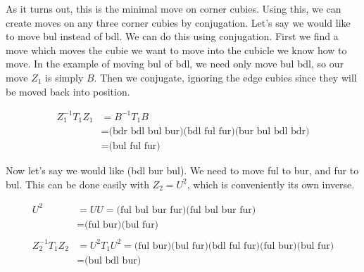 As it turns out, this is the minimal move on corner cubies.  Using
this, we can create moves on any three corner cubies by conjugation.
Let's say we would like to move bul instead of bdl.  We can do this
using conjugation.  First we find a move which moves the cubie we want
to move into the cubicle we know how to move.  In the example of
moving bul of bdl, we need only move bul bdl, so our move $Z_1$ is
simply $B$.  Then we conjugate, ignoring the edge cubies since they
will be moved back into position.

\begin{align*}
  Z_1^{-1}T_1Z_1
  &= B^{-1}T_1B \\
  &= \text{(bdr bdl bul bur)(bdl ful fur)(bur bul bdl bdr)} \\
  &= \text{(bul ful fur)}
\end{align*}

Now let's say we would like (bdl bur bul).  We need to move ful to
bur, and fur to bul.  This can be done easily with $Z_2 = U^2$, which
is conveniently its own inverse.

\begin{align*}
  U^2
  &= UU = \text{(ful bul bur fur)(ful bul bur fur)} \\
  &= \text{(ful bur)(bul fur)} \\
  & \\
  Z_2^{-1}T_1Z_2
  &= U^2T_1U^2 = \text{(ful bur)(bul fur)(bdl ful fur)(ful bur)(bul fur)} \\
  &= \text{(bul bdl bur)}
\end{align*}
  
